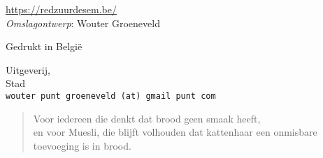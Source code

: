 \vfill

\url{https://redzuurdesem.be/} \\

\hspace*{2em} \textit{Omslagontwerp}: Wouter Groeneveld \\

\vfill

Gedrukt in België

Uitgeverij, \\
Stad \\
\texttt{wouter punt groeneveld (at) gmail punt com}

\vspace*{2\baselineskip}


\clearpage

 \newenvironment{dedication}
     {\vspace{6ex}\begin{quotation}\begin{center}\begin{em}}
     {\par\end{em}\end{center}\end{quotation}}

\begin{dedication}
	Voor iedereen die denkt dat brood geen smaak heeft, \\
	en voor Muesli, die blijft volhouden dat kattenhaar een onmisbare toevoeging is in brood. 
\end{dedication}

\endgroup
\clearpage
\pagestyle{plain}
